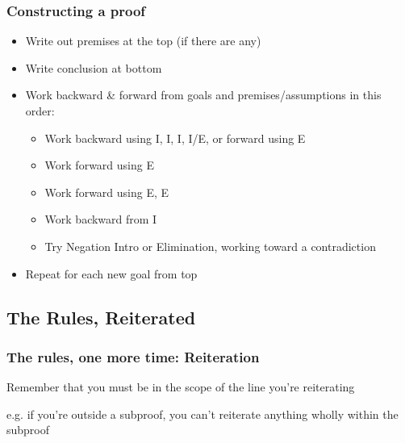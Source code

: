 \begin{frame}
  \frametitle{Constructing a proof}

  \begin{itemize}[<+->]
    \item Write out premises at the top (if there are any)
    \item Write conclusion at bottom
    \item Work backward \& forward from goals and premises/assumptions
    in this order:
    \begin{itemize}[<+->]
      \item Work backward using \eand I, \eif I, \eiff I, \enot I/E, or
      forward using \eor E
      \item Work forward using \eand E
      \item Work forward using \eif E, \eiff E
      \item Work backward from \eor I
      \item Try Negation Intro or Elimination, working toward a contradiction
    \end{itemize}
    \item Repeat for each new goal from top
  \end{itemize}
\end{frame}



\subsection{The Rules, Reiterated}

\begin{frame}
  \frametitle{The rules, one more time: Reiteration}
  
\begin{multicols}{2}

    \begin{fitchproof}
     \ellipsesline
       
    \end{fitchproof}
  
\columnbreak
  
  
  \bi
  
  \item Remember that you must be in the scope of the line you're reiterating
  
  \item e.g. if you're outside a subproof, you can't reiterate anything wholly within the subproof
  
  \ei
  
\end{multicols}
\end{frame}

